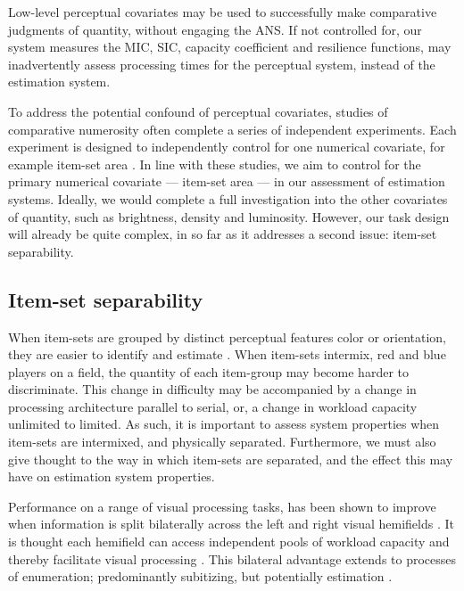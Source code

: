 Low-level perceptual covariates may be used to successfully make comparative judgments of quantity, without engaging the ANS. If not controlled for, our system measures the MIC, SIC, capacity coefficient and resilience functions, may inadvertently assess processing times for the perceptual system, instead of the estimation system. 

To address the potential confound of perceptual covariates, studies of comparative numerosity often complete a series of independent experiments. Each experiment is designed to independently control for one numerical covariate, for example item-set area \cite{HALBERDA_2006}. In line with these studies, we aim to control for the primary numerical covariate --- item-set area --- in our assessment of estimation systems. Ideally, we would complete a full investigation into the other covariates of quantity, such as brightness, density and luminosity. However, our task design will already be quite complex, in so far as it addresses a second issue: item-set separability.

\subsection{Item-set separability}
When item-sets are grouped by distinct perceptual features \eg color or orientation, they are easier to identify \cite{treisman1980feature} and estimate \cite{Burr2010,HALBERDA_2006}. When item-sets intermix, \eg red and blue players on a field, the quantity of each item-group may become harder to discriminate. This change in difficulty may be accompanied by a change in processing architecture \ie parallel to serial, or, a change in workload capacity \ie unlimited to limited. As such, it is important to assess system properties when item-sets are intermixed, and physically separated. Furthermore, we must also give thought to the way in which item-sets are separated, and the effect this may have on estimation system properties. 

Performance on a range of visual processing tasks, has been shown to improve when information is split bilaterally across the left and right visual hemifields \cite{alvarez2005independent,delvenne2005capacity,kraft2013visual}. It is thought each hemifield can access independent pools of workload capacity and thereby facilitate visual processing \cite{alvarez2005independent}. This bilateral advantage extends to processes of enumeration; predominantly subitizing, but potentially estimation \cite{pryor2015bilateral,delvenne2011bilateral}. 

